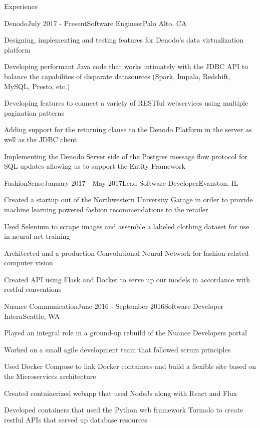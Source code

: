 \documentclass{resume} %
\begin{document}
\begin{rSection}{Experience}

\begin{rSubsection}{Denodo}{July 2017 - Present}{Software Engineer}{Palo Alto, CA}
\item Designing, implementing and testing features for Denodo's data virtualization platform
\item Developing performant Java code that works intimately with the JDBC API to balance the capabilites of disparate datasources (Spark, Impala, Redshift, MySQL, Presto, etc.)
\item Developing features to connect a variety of RESTful webservices using multiple pagination patterns
\item Adding support for the returning clause to the Denodo Platform in the server as well as the JDBC client
\item Implementing the Denodo Server side of the Postgres message flow protocol for SQL updates allowing us to support the Entity Framework
\end{rSubsection}

\begin{rSubsection}{FashionSense}{January 2017 - May 2017}{Lead Software Developer}{Evanston, IL}
\item Created a startup out of the Northwestern University Garage in order to provide machine learning powered fashion recommendations to the retailer
\item Used Selenium to scrape images and assemble a labeled clothing dataset for use in neural net training
\item Architected and a production Convolutional Neural Network for fashion-related computer vision
\item Created API using Flask and Docker to serve up our models in accordance with restful conventions
\end{rSubsection}


\begin{rSubsection}{Nuance Communication}{June 2016 - September 2016}{Software Developer Intern}{Seattle, WA}
\item Played an integral role in a ground-up rebuild of the Nuance Developers portal
\item Worked on a small agile development team that followed scrum principles
\item Used Docker Compose to link Docker containers and build a flexible site based on the
Microservices architecture
\item Created containerized webapp that used NodeJs along with React and Flux
\item Developed containers that used the Python web framework Tornado to create restful APIs that served up database resources
\end{rSubsection}


\end{rSection}
\end{document}
